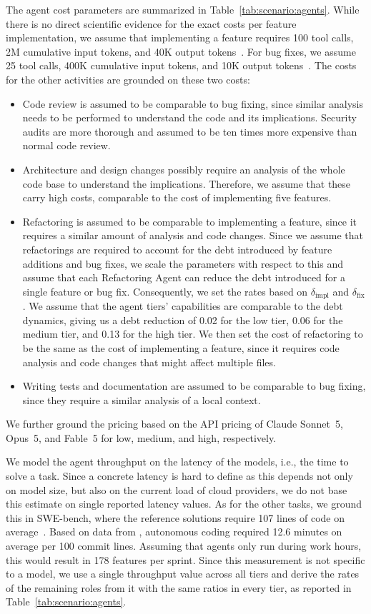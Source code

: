 \documentclass[smallextended]{svjour3}       %
\begin{document}
The agent cost parameters are summarized in Table~\ref{tab:scenario:agents}. While there is no direct scientific evidence for the exact costs per feature implementation, we assume that implementing a feature requires 100 tool calls, 2M cumulative input tokens, and 40K output tokens~\citep{morph2026aicodingcosts}. For bug fixes, we assume 25 tool calls, 400K cumulative input tokens, and 10K output tokens~\citep{morph2026aicodingcosts}. The costs for the other activities are grounded on these two costs:
\begin{itemize}
  \item Code review is assumed to be comparable to bug fixing, since similar analysis needs to be performed to understand the code and its implications. Security audits are more thorough and assumed to be ten times more expensive than normal code review.
  \item Architecture and design changes possibly require an analysis of the whole code base to understand the implications. Therefore, we assume that these carry high costs, comparable to the cost of implementing five features.
  \item Refactoring is assumed to be comparable to implementing a feature, since it requires a similar amount of analysis and code changes. Since we assume that refactorings are required to account for the debt introduced by feature additions and bug fixes, we scale the parameters with respect to this and assume that each Refactoring Agent can reduce the debt introduced for a single feature or bug fix. Consequently, we set the rates based on $\delta_\mathrm{impl}$ and $\delta_\mathrm{fix}$. We assume that the agent tiers' capabilities are comparable to the debt dynamics, giving us a debt reduction of 0.02 for the low tier, 0.06 for the medium tier, and 0.13 for the high tier. We then set the cost of refactoring to be the same as the cost of implementing a feature, since it requires code analysis and code changes that might affect multiple files. 
  \item Writing tests and documentation are assumed to be comparable to bug fixing, since they require a similar analysis of a local context.
\end{itemize}
We further ground the pricing based on the API pricing of Claude Sonnet~5, Opus~5, and Fable~5 for low, medium, and high, respectively.

We model the agent throughput on the latency of the models, i.e., the time to solve a task. Since a concrete latency is hard to define as this depends not only on model size, but also on the current load of cloud providers, we do not base this estimate on single reported latency values. As for the other tasks, we ground this in SWE-bench, where the reference solutions require 107 lines of code on average~\citep{scaleSWEBenchPublic}. Based on data from \cite{baumann2026swechat}, autonomous coding required 12.6 minutes on average per 100 commit lines. Assuming that agents only run during work hours, this would result in 178 features per sprint. Since this measurement is not specific to a model, we use a single throughput value across all tiers and derive the rates of the remaining roles from it with the same ratios in every tier, as reported in Table~\ref{tab:scenario:agents}.
\end{document}
